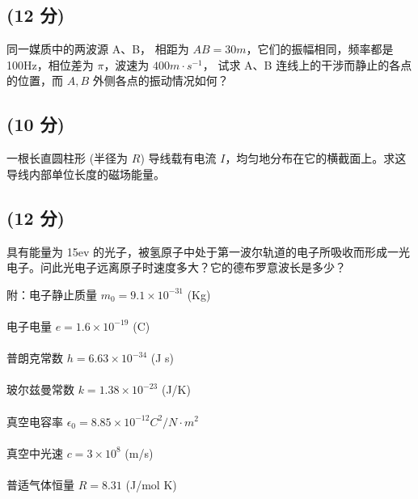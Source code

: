 \subsection{(12 分)}
同一媒质中的两波源 A、B， 相距为 \( AB=30m \)，它们的振幅相同，频率都是 100Hz，相位差为 \( \pi \)，波速为 \( 400m \cdot s^{-1} \)， 试求 A、B 连线上的干涉而静止的各点的位置，而 \(A,B\) 外侧各点的振动情况如何？
\subsection{(10 分)}
一根长直圆柱形 (半径为 \( R\)) 导线载有电流 \( I \)，均匀地分布在它的横截面上。求这导线内部单位长度的磁场能量。
\subsection{(12 分)}
具有能量为 15ev 的光子，被氢原子中处于第一波尔轨道的电子所吸收而形成一光电子。问此光电子远离原子时速度多大？它的德布罗意波长是多少？

附：电子静止质量 \( m_0=9.1 \times 10^{-31} \) (Kg) \\\\
电子电量 \( e=1.6 \times 10^{-19} \) (C) \\\\
普朗克常数 \( h=6.63 \times 10^{-34} \) (J \cdot s) \\\\
玻尔兹曼常数 \( k=1.38 \times 10^{-23} \) (J/K) \\\\
真空电容率 \( \epsilon_0=8.85 \times 10^{-12} C^2/N \cdot m^2 \) \\\\
真空中光速 \( c=3 \times 10^8 \) (m/s) \\\\
普适气体恒量 \( R=8.31 \) (J/mol \cdot K)